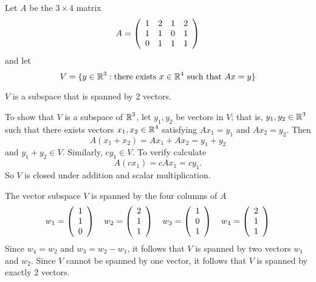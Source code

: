 \documentclass{ximera}
\begin{document}
\begin{exercise}\label{C5.2.3D}
Let $A$ be the $3\times 4$ matrix
\[
A = \left(\begin{array}{rrrrrrrrrrrrrrrrrr}  1 & 2 & 1 & 2\\ 1 & 1 & 0 & 1 \\ 0 & 1 & 1 & 1 \end{array}\right)
\] 
and let 
\[
V = \{y\in\mbox{$\Bbb{R}$}^3: \mbox{there exists }  x\in\mbox{$\Bbb{R}$}^4 \mbox{ such that } Ax = y\}
\]


\begin{solution}
\ans $V$ is a subspace that is spanned by $2$ vectors.

\soln
To show that $V$ is a subspace of $\mbox{$\Bbb{R}$}^3$, let $y_1, y_2$ be vectors in $V$; that is, $y_1,y_2\in\mbox{$\Bbb{R}$}^3$ such that there exists vectors $x_1,x_2\in\mbox{$\Bbb{R}$}^4$ satisfying $Ax_1 = y_1$ and $Ax_2 = y_2$.  Then 
\[
A(x_1+x_2) = Ax_1 + Ax_2 = y_1 + y_2
\] 
and $y_1+y_2 \in V$.  Similarly, $cy_1\in V$.  To verify calculate
\[
A(cx_1) = cAx_1 = c y_1.
\]
So $V$ is closed under addition and scalar multiplication. 

The vector subspace $V$ is spanned by the four columns of $A$
\[
w_1 = \left(\begin{array}{rrrrrrrrrrrrrrrrrr} 1 \\ 1 \\ 0 \end{array}\right) \quad  w_2 = \left(\begin{array}{rrrrrrrrrrrrrrrrrr} 2 \\ 1 \\ 1 \end{array}\right) \quad  w_3 = \left(\begin{array}{rrrrrrrrrrrrrrrrrr} 1 \\ 0 \\ 1 \end{array}\right) \quad  w_4 = \left(\begin{array}{rrrrrrrrrrrrrrrrrr} 2 \\ 1 \\ 1 \end{array}\right) 
\]
Since $w_4 = w_2$ and $w_3 = w_2 - w_1$, it follows that $V$ is spanned by two vectors $w_1$ and $w_2$.  Since $V$ cannot be spanned by one vector, it follows that $V$ is spanned by exactly $2$ vectors.
\end{solution}
\end{exercise}

  
\end{document}
